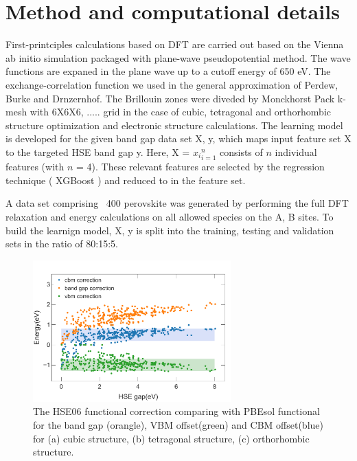 \documentclass[%
twocolumn,
 amsmath,amssymb,
 aps, citeautoscript,
prb,
]{revtex4-1}
\begin{document}
\section{Method and computational details}

First-printciples calculations based on DFT are carried out based on the Vienna ab initio simulation packaged with plane-wave pseudopotential method\cite{}. The wave functions are expaned in the plane wave up to a cutoff energy of 650 eV. The exchange-correlation function we used in the general approximation of Perdew, Burke and Drnzernhof\cite{}. The Brillouin zones were diveded by Monckhorst Pack k-mesh with 6X6X6, ..... grid in the case of cubic, tetragonal and orthorhombic structure optimization and electronic structure calculations.
The learning model is developed for the given band gap data set {X, y}, which maps input feature set X to the targeted HSE band gap y. Here, X = ${x_{i}}_{i = 1} ^{n}$ consists of $n$ individual features (with $n$ = 4). These relevant features are selected by the regression technique ( XGBoost ) and reduced to in the feature set. 


A data set comprising ~400 perovskite was generated by performing the full DFT relaxation and energy calculations on all allowed species on the A, B sites.  
To build the learnign model, {X, y} is split into the training, testing and validation sets in the ratio of 80:15:5.  

\begin{figure}[ht!]
\begin{center}
\includegraphics[width=3.0in]{Figures/Fig2.pdf}
\end{center}
\caption{ The HSE06 functional correction comparing with PBEsol functional for the band gap (orangle), VBM offset(green) and CBM offset(blue) for (a) cubic structure, (b) tetragonal structure, (c) orthorhombic structure. 
}
\label{fig1}
\end{figure}
\end{document}
